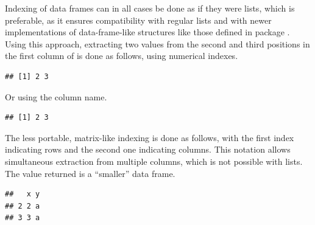 \documentclass[krantz2]{krantz}\usepackage{knitr}%
\begin{document}
\begin{explainbox}
Indexing of data frames can in all cases be done as if they were lists, which is preferable, as it ensures compatibility with regular \Rlang lists and with newer implementations of data-frame-like structures like those defined in package . Using this approach, extracting two values from the second and third positions in the first column of  is done as follows, using numerical indexes.

\begin{knitrout}\footnotesize
{}\color{fgcolor}\begin{kframe}
\begin{alltt}
\hlstd{a.df[[}\hlstd{]][}\hlopt{:}\hlstd{]}
\end{alltt}
\begin{verbatim}
## [1] 2 3
\end{verbatim}
\end{kframe}
\end{knitrout}

Or using the column name.

\begin{knitrout}\footnotesize
{}\color{fgcolor}\begin{kframe}
\begin{alltt}
\hlstd{a.df[[}\hlstd{]][}\hlopt{:}\hlstd{]}
\end{alltt}
\begin{verbatim}
## [1] 2 3
\end{verbatim}
\end{kframe}
\end{knitrout}

The less portable, matrix-like indexing is done as follows, with the first index indicating rows and the second one indicating columns. This notation allows simultaneous extraction from multiple columns, which is not possible with lists. The value returned is a ``smaller'' data frame.

\begin{knitrout}\footnotesize
{}\color{fgcolor}\begin{kframe}
\begin{alltt}
\hlstd{a.df[}\hlopt{:}\hlstd{,} \hlopt{:}\hlstd{]}
\end{alltt}
\begin{verbatim}
##   x y
## 2 2 a
## 3 3 a
\end{verbatim}
\end{kframe}
\end{knitrout}


\end{explainbox}
\end{document}
